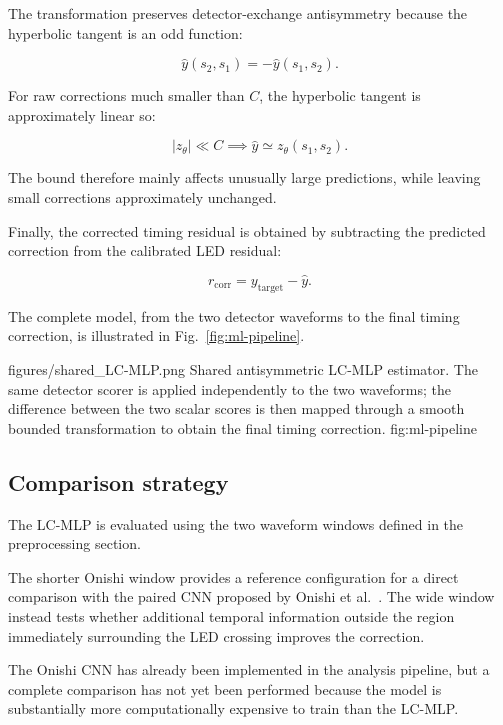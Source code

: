 The transformation preserves detector-exchange antisymmetry because the hyperbolic tangent is an odd function:

\begin{equation}
    \widehat{y}(s_2,s_1)
    =
    -\widehat{y}(s_1,s_2).
\end{equation}

For raw corrections much smaller than \(C\), the hyperbolic tangent is approximately linear so:

\begin{equation}
    |z_\theta| \ll C
    \implies
    \widehat{y}
    \simeq
    z_\theta(s_1,s_2).
\end{equation}

The bound therefore mainly affects unusually large predictions, while leaving small corrections approximately unchanged.

Finally, the corrected timing residual is obtained by subtracting the predicted correction from the calibrated LED residual:

\begin{equation}
    r_{\mathrm{corr}}
    =
    y_{\mathrm{target}}-\widehat{y}.
\end{equation}

The complete model, from the two detector waveforms to the final timing correction, is illustrated in Fig.~\ref{fig:ml-pipeline}.

\reportfigure
    {figures/shared_LC-MLP.png}
    {Shared antisymmetric LC-MLP estimator. The same detector scorer is applied independently to the two waveforms; 
    the difference between the two scalar scores is then mapped through a smooth bounded transformation to obtain the final timing correction.}
    {fig:ml-pipeline}

\subsection{Comparison strategy}

The LC-MLP is evaluated using the two waveform windows defined in the preprocessing section.

The shorter Onishi window provides a reference configuration for a direct comparison with the paired CNN proposed by Onishi et al.~\cite{onishi2022}. 
The wide window instead tests whether additional temporal information outside the region immediately surrounding the LED crossing improves the correction.

The Onishi CNN has already been implemented in the analysis pipeline, but a complete comparison has not yet been performed because the model is 
substantially more computationally expensive to train than the LC-MLP.

